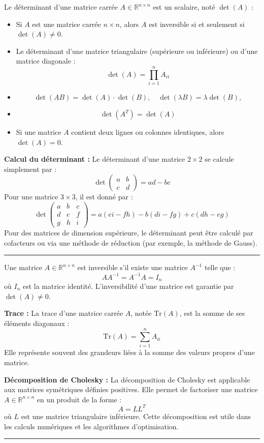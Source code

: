 \begin{f}
  
Le déterminant d'une matrice carrée \( A \in \mathbb{R}^{n \times n} \) est un scalaire, noté \( \det(A) \) :
\begin{itemize}
    \item Si \( A \) est une matrice carrée \( n \times n \), alors \( A \) est inversible si et seulement si \( \det(A) \neq 0 \).
    \item Le déterminant d'une matrice triangulaire (supérieure ou inférieure) ou d'une matrice diagonale :
    \[
    \det(A) = \prod_{i=1}^{n} A_{ii}
    \]
    \item
    \[
    \det(AB) = \det(A) \cdot \det(B),\quad \det(\lambda B) = \lambda\det(B), 
    \]
    \item 
    \[
    \det(A^T) = \det(A)
    \]
    \item Si une matrice \( A \) contient deux lignes ou colonnes identiques, alors \( \det(A) = 0 \).
\end{itemize}

\textbf{Calcul du déterminant :}
Le déterminant d'une matrice \( 2 \times 2 \) se calcule simplement par :
\[
\det\begin{pmatrix} a & b \\ c & d \end{pmatrix} = ad - bc
\]
Pour une matrice \( 3 \times 3 \), il est donné par :
\[
\det\begin{pmatrix} a & b & c \\ d & e & f \\ g & h & i \end{pmatrix} = a(ei - fh) - b(di - fg) + c(dh - eg)
\]
Pour des matrices de dimension supérieure, le déterminant peut être calculé par cofacteurs ou via une méthode de réduction (par exemple, la méthode de Gauss).

\end{f}
\hrule
\begin{f} 
Une matrice \( A \in \mathbb{R}^{n \times n} \) est inversible s'il existe une matrice \( A^{-1} \) telle que :
\[
A A^{-1} = A^{-1} A = I_n
\]
où \( I_n \) est la matrice identité. L'inversibilité d'une matrice est garantie par \( \det(A) \neq 0 \).

\textbf{Trace :}
La trace d'une matrice carrée \( A \), notée \( \text{Tr}(A) \), est la somme de ses éléments diagonaux :
\[
\text{Tr}(A) = \sum_{i=1}^{n} A_{ii}
\]
Elle représente souvent des grandeurs liées à la somme des valeurs propres d'une matrice.

\textbf{Décomposition de Cholesky :}
La décomposition de Cholesky est applicable aux matrices symétriques définies positives. Elle permet de factoriser une matrice \( A \in \mathbb{R}^{n \times n} \) en un produit de la forme :
\[
A = LL^T
\]
où \( L \) est une matrice triangulaire inférieure. Cette décomposition est utile dans les calculs numériques et les algorithmes d'optimisation.

\end{f}
\hrule

